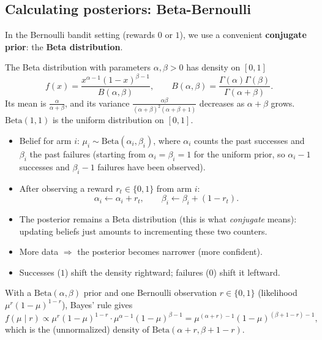 \subsection{Calculating posteriors: Beta-Bernoulli}

In the Bernoulli bandit setting (rewards $0$ or $1$), we use a convenient \textbf{conjugate prior}: the \textbf{Beta distribution}.

\begin{definition}
The Beta distribution with parameters $\alpha, \beta > 0$ has density on $[0,1]$
\[
f(x) = \frac{x^{\alpha - 1}(1-x)^{\beta - 1}}{B(\alpha, \beta)}, \qquad B(\alpha, \beta) = \frac{\Gamma(\alpha)\Gamma(\beta)}{\Gamma(\alpha + \beta)}.
\]
Its mean is $\frac{\alpha}{\alpha + \beta}$, and its variance $\frac{\alpha\beta}{(\alpha+\beta)^2(\alpha+\beta+1)}$ decreases as $\alpha + \beta$ grows. $\text{Beta}(1,1)$ is the uniform distribution on $[0,1]$.
\end{definition}

\begin{itemize}
    \item Belief for arm $i$: $\mu_i \sim \text{Beta}(\alpha_i, \beta_i)$, where $\alpha_i$ counts the past successes and $\beta_i$ the past failures (starting from $\alpha_i = \beta_i = 1$ for the uniform prior, so $\alpha_i - 1$ successes and $\beta_i - 1$ failures have been observed).
    \item After observing a reward $r_t \in \{0, 1\}$ from arm $i$:
    \[
    \alpha_i \leftarrow \alpha_i + r_t, \qquad \beta_i \leftarrow \beta_i + (1 - r_t).
    \]
    \item The posterior remains a Beta distribution (this is what \emph{conjugate} means): updating beliefs just amounts to incrementing these two counters.
    \item More data $\Rightarrow$ the posterior becomes narrower (more confident).
    \item Successes ($1$) shift the density rightward; failures ($0$) shift it leftward.
\end{itemize}

\begin{remark}
With a $\text{Beta}(\alpha,\beta)$ prior and one Bernoulli observation $r \in \{0,1\}$ (likelihood $\mu^r(1-\mu)^{1-r}$), Bayes' rule gives
\[
f(\mu \mid r) \propto \mu^r(1-\mu)^{1-r} \cdot \mu^{\alpha-1}(1-\mu)^{\beta-1} = \mu^{(\alpha + r) - 1}(1-\mu)^{(\beta + 1 - r) - 1},
\]
which is the (unnormalized) density of $\text{Beta}(\alpha + r, \beta + 1 - r)$.
\end{remark}

